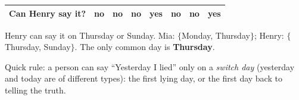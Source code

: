 {\begin{center}
\begin{tabular}{|l|c|c|c|c|c|c|c|}
Can Henry say it? & no & no & no & \textbf{yes} & no & no & \textbf{yes}\\ \hline
\end{tabular}
\end{center}
Henry can say it on Thursday or Sunday.
Mia: $\{$Monday, Thursday$\}$; Henry: $\{$Thursday, Sunday$\}$. The only common day is \textbf{Thursday}.
\begin{tipbox}Quick rule: a person can say ``Yesterday I lied'' only on a \emph{switch day} (yesterday and today are of different
types): the first lying day, or the first day back to telling the truth.\end{tipbox}
}

